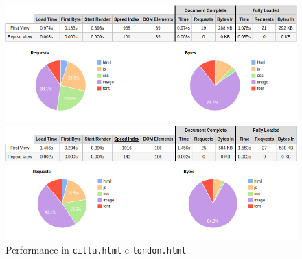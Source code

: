 \begin{figure}[h]
\begin{minipage}{0.45\textwidth}
\includegraphics[width=\linewidth]{images/performance/webpagetest/citta.png}
\end{minipage}
\hspace{\fill}
\vspace*{0.5cm}
\begin{minipage}{0.45\textwidth}

\includegraphics[width=\linewidth]{images/performance/webpagetest/citta-graph.png}
\end{minipage}

\begin{minipage}{0.45\textwidth}
\vspace*{0.5cm}
\includegraphics[width=\linewidth]{images/performance/webpagetest/london.png}
\end{minipage}
\hspace{\fill}
\vspace*{0.5cm}
\begin{minipage}{0.45\textwidth}

\includegraphics[width=\linewidth]{images/performance/webpagetest/london-graph.png}
\end{minipage}
\caption{Performance in \texttt{citta.html} e \texttt{london.html}}\label{multiavp}
\label{fig:tempiOther}
\end{figure}

